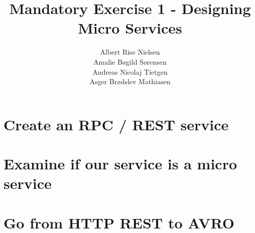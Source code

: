 \documentclass{article}
\title{Mandatory Exercise 1 - Designing Micro Services}
\author{Albert Rise Nielsen\\Amalie Bøgild Sørensen\\Andreas Nicolaj Tietgen\\Asger Brødslev Mathiasen}
\begin{document}
\maketitle

\section{Create an RPC / REST service}


\section{Examine if our service is a micro service}

\section{Go from HTTP REST to AVRO }
\end{document}
